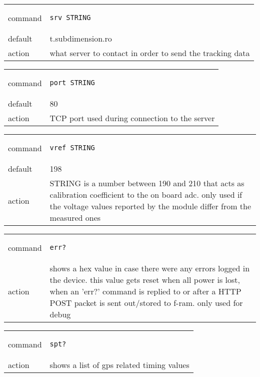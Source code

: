 \documentclass[a4paper,twoside]{refart}
\begin{document}
\begin{tabular}{ |l|p{8cm}| }
    \hline
        command & 
\begin{lstlisting}
srv STRING
\end{lstlisting} \\
        default & t.subdimension.ro \\
        action & 
what server to contact in order to send the tracking data \\ \hline
\end{tabular}


\begin{tabular}{ |l|p{8cm}| }
    \hline
        command & 
\begin{lstlisting}
port STRING
\end{lstlisting} \\
        default & 80 \\
        action & 
TCP port used during connection to the server  \\ \hline
\end{tabular}


\begin{tabular}{ |l|p{8cm}| }
    \hline
        command & 
\begin{lstlisting}
vref STRING
\end{lstlisting} \\
        default & 198 \\
        action & 
STRING is a number between 190 and 210 that acts as calibration coefficient to the on board \gls{adc}. only used if the voltage values reported by the module differ from the measured ones \\ \hline
\end{tabular}


\begin{tabular}{ |l|p{8cm}| }
    \hline
        command & 
\begin{lstlisting}
err?
\end{lstlisting} \\
        action & 
shows a hex value in case there were any errors logged in the device. this value gets reset when all power is lost, when an 'err?' command is replied to or after a HTTP POST packet is sent out/stored to \gls{f-ram}. only used for debug  \\ \hline
\end{tabular}

\begin{tabular}{ |l|p{8cm}| }
    \hline
        command & 
\begin{lstlisting}
spt?
\end{lstlisting} \\
        action & 
shows a list of gps related timing values\\ \hline
\end{tabular}
\end{document}
